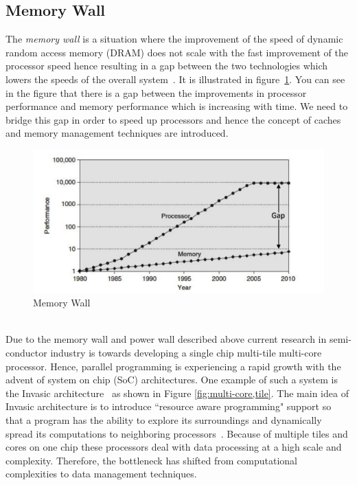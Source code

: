 \documentclass{listhesis}
\begin{document}
\subsection{Memory Wall}
The \textit{memory wall} is a situation where the improvement of the speed of dynamic random access memory (DRAM) does not scale with the fast improvement of the processor speed hence resulting in a gap between the two technologies which lowers the speeds of the overall system~\cite{memorywall}. It is illustrated in figure~\ref{fig:memorywall}. You can see in the figure that there is a gap between the improvements in processor performance and memory performance which is increasing with time. We need to bridge this gap in order to speed up processors and hence the concept of caches and memory management techniques are introduced.\\
\begin{figure}[h!]
  \includegraphics[width=\linewidth]{memorywall.png}
  \centering
  \caption{Memory Wall~\cite{hennessy}}
  \label{fig:memorywall}
\end{figure}
\\
Due to the memory wall and power wall described above current research in semi-conductor industry is towards developing a single chip multi-tile multi-core processor. Hence, parallel programming is experiencing a rapid growth with the advent of system on chip (SoC) architectures. One example of such a system is the Invasic architecture~\cite{invasive} as shown in Figure \ref{fig:multi-core,tile}. The main idea of Invasic architecture is to introduce ``resource aware programming" support so that a program has the ability to explore its surroundings and dynamically spread its computations to neighboring processors~\cite{invasive}. Because of multiple tiles and cores on one chip these processors deal with data processing at a high scale and complexity. Therefore, the bottleneck has shifted from computational complexities to data management techniques.\\
\end{document}
